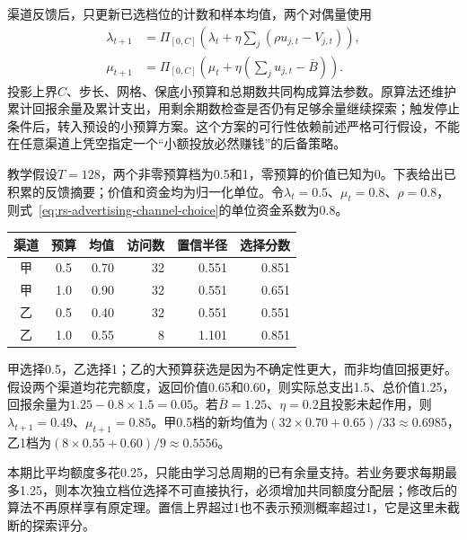 渠道反馈后，只更新已选档位的计数和样本均值，两个对偶量使用
\begin{equation}
  \begin{aligned}
    \lambda_{t+1}
      &=\Pi_{[0,C]}\!\left(
         \lambda_t+\eta\sum_j(\rho u_{j,t}-V_{j,t})\right),\\
    \mu_{t+1}
      &=\Pi_{[0,C]}\!\left(
         \mu_t+\eta\left(\sum_j u_{j,t}-\bar B\right)\right).
  \end{aligned}
  \label{eq:rs-advertising-channel-dual}
\end{equation}
投影上界$C$、步长、网格、保底小预算和总期数共同构成算法参数。原算法还维护累计回报余量及累计支出，用剩余期数检查是否仍有足够余量继续探索；触发停止条件后，转入预设的小预算方案。这个方案的可行性依赖前述严格可行假设，不能在任意渠道上凭空指定一个“小额投放必然赚钱”的后备策略。

\begin{example}[两渠道的一次预算学习]
\label{ex:rs-advertising-channel}
教学假设$T=128$，两个非零预算档为0.5和1，零预算的价值已知为0。下表给出已积累的反馈摘要；价值和资金均为归一化单位。令$\lambda_t=0.5$、$\mu_t=0.8$、$\rho=0.8$，则式~\eqref{eq:rs-advertising-channel-choice}的单位资金系数为0.8。
\begin{center}
  \begin{tabular}{@{}ccrrrr@{}}
    \toprule
    渠道 & 预算 & 均值 & 访问数 & 置信半径 & 选择分数\\
    \midrule
    甲 & 0.5 & 0.70 & 32 & 0.551 & 0.851\\
    甲 & 1.0 & 0.90 & 32 & 0.551 & 0.651\\
    乙 & 0.5 & 0.40 & 32 & 0.551 & 0.551\\
    乙 & 1.0 & 0.55 & 8  & 1.101 & 0.851\\
    \bottomrule
  \end{tabular}
\end{center}
甲选择0.5，乙选择1；乙的大预算获选是因为不确定性更大，而非均值回报更好。假设两个渠道均花完额度，返回价值0.65和0.60，则实际总支出1.5、总价值1.25，回报余量为$1.25-0.8\times1.5=0.05$。若$\bar B=1.25$、$\eta=0.2$且投影未起作用，则$\lambda_{t+1}=0.49$、$\mu_{t+1}=0.85$。甲0.5档的新均值为$(32\times0.70+0.65)/33\approx0.6985$，乙1档为$(8\times0.55+0.60)/9\approx0.5556$。

本期比平均额度多花0.25，只能由学习总周期的已有余量支持。若业务要求每期最多1.25，则本次独立档位选择不可直接执行，必须增加共同额度分配层；修改后的算法不再原样享有原定理。置信上界超过1也不表示预测概率超过1，它是这里未截断的探索评分。
\end{example}

